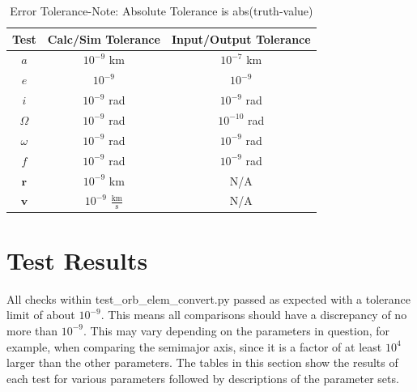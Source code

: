 \begin{table}[H]
	\caption{Error Tolerance-Note: Absolute Tolerance is abs(truth-value)}
	\centering \fontsize{10}{10}\selectfont
	\begin{tabular}{c|c|c}
		\hline \textbf{Test} & \textbf{Calc/Sim Tolerance} & \textbf{Input/Output Tolerance}\\ \hline $a$ & $10^{-9}$ km & $10^{-7}$ km\\ $e$ & $10^{-9}$ & $10^{-9}$\\
		$i$ & $10^{-9}$ rad & $10^{-9}$ rad\\
		$\Omega$ & $10^{-9}$ rad & $10^{-10}$ rad\\
		$\omega$ & $10^{-9}$ rad & $10^{-9}$ rad\\
		$f$ & $10^{-9}$ rad & $10^{-9}$ rad\\
		$\bm{r}$ & $10^{-9}$ km & N/A\\
		$\bm{v}$ & $10^{-9}$ $\frac{\text{km}}{\text{s}}$ & N/A\\
		\hline
	\end{tabular}
\end{table}

\section{Test Results}

All checks within test\_orb\_elem\_convert.py passed as expected with a tolerance limit of about $10^{-9}$. This means all comparisons should have a discrepancy of no more than $10^{-9}$. This may vary depending on the parameters in question, for example, when comparing the semimajor axis, since it is a factor of at least $10^4$ larger than the other parameters. The tables in this section show the results of each test for various parameters followed by descriptions of the parameter sets.

